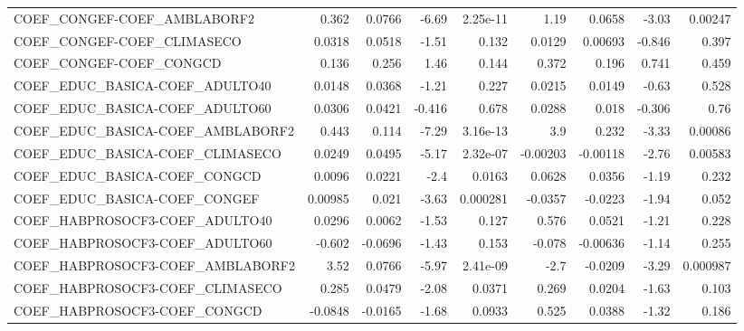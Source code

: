 \begin{tabular}{lrrrrrrrr}
COEF\_CONGEF-COEF\_AMBLABORF2            &       0.362 &       0.0766 &   -6.69 & 2.25e-11 &       1.19 &      0.0658 &        -3.03 &       0.00247 \\
COEF\_CONGEF-COEF\_CLIMASECO             &      0.0318 &       0.0518 &   -1.51 &    0.132 &     0.0129 &     0.00693 &       -0.846 &         0.397 \\
COEF\_CONGEF-COEF\_CONGCD                &       0.136 &        0.256 &    1.46 &    0.144 &      0.372 &       0.196 &        0.741 &         0.459 \\
COEF\_EDUC\_BASICA-COEF\_ADULTO40         &      0.0148 &       0.0368 &   -1.21 &    0.227 &     0.0215 &      0.0149 &        -0.63 &         0.528 \\
COEF\_EDUC\_BASICA-COEF\_ADULTO60         &      0.0306 &       0.0421 &  -0.416 &    0.678 &     0.0288 &       0.018 &       -0.306 &          0.76 \\
COEF\_EDUC\_BASICA-COEF\_AMBLABORF2       &       0.443 &        0.114 &   -7.29 & 3.16e-13 &        3.9 &       0.232 &        -3.33 &       0.00086 \\
COEF\_EDUC\_BASICA-COEF\_CLIMASECO        &      0.0249 &       0.0495 &   -5.17 & 2.32e-07 &   -0.00203 &    -0.00118 &        -2.76 &       0.00583 \\
COEF\_EDUC\_BASICA-COEF\_CONGCD           &      0.0096 &       0.0221 &    -2.4 &   0.0163 &     0.0628 &      0.0356 &        -1.19 &         0.232 \\
COEF\_EDUC\_BASICA-COEF\_CONGEF           &     0.00985 &        0.021 &   -3.63 & 0.000281 &    -0.0357 &     -0.0223 &        -1.94 &         0.052 \\
COEF\_HABPROSOCF3-COEF\_ADULTO40         &      0.0296 &       0.0062 &   -1.53 &    0.127 &      0.576 &      0.0521 &        -1.21 &         0.228 \\
COEF\_HABPROSOCF3-COEF\_ADULTO60         &      -0.602 &      -0.0696 &   -1.43 &    0.153 &     -0.078 &    -0.00636 &        -1.14 &         0.255 \\
COEF\_HABPROSOCF3-COEF\_AMBLABORF2       &        3.52 &       0.0766 &   -5.97 & 2.41e-09 &       -2.7 &     -0.0209 &        -3.29 &      0.000987 \\
COEF\_HABPROSOCF3-COEF\_CLIMASECO        &       0.285 &       0.0479 &   -2.08 &   0.0371 &      0.269 &      0.0204 &        -1.63 &         0.103 \\
COEF\_HABPROSOCF3-COEF\_CONGCD           &     -0.0848 &      -0.0165 &   -1.68 &   0.0933 &      0.525 &      0.0388 &        -1.32 &         0.186 \\

\end{tabular}
